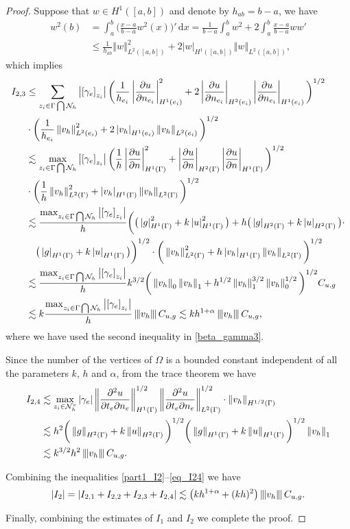 \documentclass[leqno,final]{siamltex}
\numberwithin{equation}{section}
\newcommand{\norm}[1]{\left\Vert#1\right\Vert}
\newcommand{\norme}[1]{\left\Vert{\hskip -2.7pt}\left\vert #1 \right\vert{\hskip -2.7pt}\right\Vert}
\newcommand{\abs}[1]{\left\vert#1\right\vert}
\newcommand{\jm}[1]{\left[#1\right]}
\newcommand{\nn}{\nonumber}
\newcommand{\ls}{\lesssim}
\newcommand{\al}{\alpha}
\newcommand{\ga}{\gamma}
\newcommand{\Ga}{\Gamma}
\newcommand{\Om}{\Omega}
\newcommand{\pa}{\partial}
\newcommand{\dx}{\,\mathrm{d} x}
\newcommand{\N}{\mathcal{N}}
\newcommand{\eq}[1]{\begin{align}#1\end{align}}
\newcommand{\eqn}[1]{\begin{align*}#1\end{align*}}
\begin{document}
\begin{proof}
Suppose that $w\in H^1([a,b])$ and denote by $h_{ab}=b-a$, we have
\eqn{
w^2(b) &= \int_a^b \bigg( \frac{x-a}{b-a} w^2(x) \bigg)' \dx = \frac{1}{b-a} \int_a^b w^2 + 2\int_a^b \frac{x-a}{b-a}ww' \\
& \leq \frac{1}{h_{ab}} \norm{w}_{L^2([a,b])}^2 + 2\abs{w}_{H^1([a,b])} \norm{w}_{L^2([a,b])},
}
which implies
\eq{
I_{2,3}&\leq  \sum_{z_i\in\Ga\bigcap\N_h} \abs{\jm{\ga_e}_{z_i}} \bigg( \frac{1}{h_{e_i}} \abs{\frac{\pa u}{\pa n_{e_i}}}_{H^1(e_i)}^2 + 2\abs{\frac{\pa u}{\pa n_{e_i}}}_{H^2(e_i)}\abs{\frac{\pa u}{\pa n_{e_i}}}_{H^1(e_i)}\bigg)^{1/2} \label{part21_I2}\\
& \cdot \bigg( \frac{1}{h_{e_i}} \norm{v_h}_{L^2(e_i)}^2 + 2\abs{v_h}_{H^1(e_i)}\norm{v_h}_{L^2(e_i)} \bigg)^{1/2}\nn\\
&\ls \max_{z_i\in\Ga\bigcap\N_h} \abs{\jm{\ga_e}_{z_i}} \bigg( \frac{1}{h} \abs{\frac{\pa u}{\pa n}}_{H^1(\Ga)}^2 + \abs{\frac{\pa u}{\pa n}}_{H^2(\Ga)}\abs{\frac{\pa u}{\pa n}}_{H^1(\Ga)}\bigg)^{1/2}\nn\\
&\cdot \bigg( \frac{1}{h} \norm{v_h}_{L^2(\Ga)}^2 + \abs{v_h}_{H^1(\Ga)}\norm{v_h}_{L^2(\Ga)} \bigg)^{1/2}\nn\\
&\ls \frac{\max_{z_i\in\Ga\bigcap\N_h}\abs{\jm{\ga_e}_{z_i}}}{h} \bigg( \big(\abs{g}_{H^1(\Ga)}^2 + k\abs{u}_{H^1(\Ga)}^2\big) + h\big(\abs{g}_{H^2(\Ga)}+k\abs{u}_{H^2(\Ga)}\big) \cdot \nn\\
&\quad\big(\abs{g}_{H^1(\Ga)}+k\abs{u}_{H^1(\Ga)}\big) \bigg)^{1/2} \cdot \bigg( \norm{v_h}_{L^2(\Ga)}^2 + h \abs{v_h}_{H^1(\Ga)}\norm{v_h}_{L^2(\Ga)} \bigg)^{1/2}\nn\\
&\ls \frac{\max_{z_i\in\Ga\bigcap\N_h}\abs{\jm{\ga_e}_{z_i}}}{h} k^{3/2} \bigg( \norm{v_h}_0 \norm{v_h}_1 + h^{1/2} \norm{v_h}_1^{3/2}\norm{v_h}_0^{1/2}\bigg)^{1/2} C_{u,g}\nn\\
&\ls k \frac{\max_{z_i\in\Ga\bigcap\N_h}\abs{\jm{\ga_e}_{z_i}}}{h}  \norme{v_h} C_{u,g} \ls kh^{1+\al} \norme{v_h} C_{u,g},\nn
}
where we have used the second inequality in \eqref{beta_gamma3}.\

Since the number of the vertices of $\Om$ is a bounded constant independent of all the parameters $k$, $h$ and $\al$, from the trace theorem we have
\eq{
I_{2,4} &\ls \max_{z_i\in\N_h^v} \abs{\ga_e} \norm{\frac{\pa^2 u}{\pa t_{e} \pa n_{e}}}_{H^1(\Ga)}^{1/2} \norm{\frac{\pa^2 u}{\pa t_{e} \pa n_{e}}}_{L^2(\Ga)}^{1/2} \cdot \norm{v_h}_{H^{1/2}(\Ga)} \label{eq_I24}\\
& \ls h^2 \bigg(\norm{g}_{H^2(\Ga)}+k\norm{u}_{H^2(\Ga)}\bigg)^{1/2}\bigg(\norm{g}_{H^1(\Ga)}+k\norm{u}_{H^1(\Ga)}\bigg)^{1/2} \norm{v_h}_1 \nn\\
&\ls k^{3/2} h^2 \norme{v_h} C_{u,g}.\nn
}

Combining the inequalities \eqref{part1_I2}--\eqref{eq_I24} we have
\eq{ 
\abs{I_2} = \abs{I_{2,1}+I_{2,2}+I_{2,3}+I_{2,4}} \ls \big(kh^{1+\al}+(kh)^2\big) \norme{v_h} C_{u,g}.\label{eq_I2}
}

Finally, combining the estimates of $I_1$ and $I_2$ we complete the proof.
\end{proof}
\end{document}
